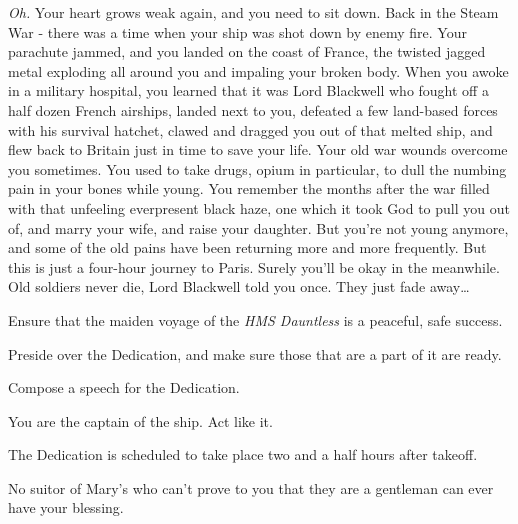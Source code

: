 \documentclass[char]{airship}
\begin{document}
{\it Oh.} Your heart grows weak again, and you need to sit down. Back in
the Steam War - there was a time when your ship was shot down by enemy
fire. Your parachute jammed, and you landed on the coast of France,
the twisted jagged metal exploding all around you and impaling your
broken body. When you awoke in a military hospital, you learned that
it was Lord Blackwell who fought off a half dozen French airships, landed
next to you, defeated a few land-based forces with his survival
hatchet, clawed and dragged you out of that melted ship, and flew
back to Britain just in time to save your life. Your old war wounds
overcome you sometimes. You used to take drugs, opium in particular,
to dull the numbing pain in your bones while young. You remember the
months after the war filled with that unfeeling everpresent black
haze, one which it took God to pull you out of, and marry your wife,
and raise your daughter. But you're not young anymore, and some of the
old pains have been returning more and more frequently. But this is
just a four-hour journey to Paris. Surely you'll be okay in the
meanwhile. Old soldiers never die, Lord Blackwell told you once. They just
fade away{\ldots}

\begin{itemz}[Goals]
  \item Ensure that the maiden voyage of the {\it HMS Dauntless} is a peaceful, safe success.
  \item Preside over the Dedication, and make sure those that are a part of it are ready.
  \item Compose a speech for the Dedication.
\end{itemz}

\begin{itemz}[Notes]
  \item You are the captain of the ship. Act like it.
  \item The Dedication is scheduled to take place two and a half hours after takeoff.
  \item No suitor of Mary's who can't prove to you that they are a gentleman can ever have your blessing.
\end{itemz}
\end{document}
